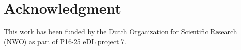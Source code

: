 



\section*{Acknowledgment}
This work has been funded by the Dutch Organization for Scientific Research (NWO) as part of P16-25 eDL project 7.